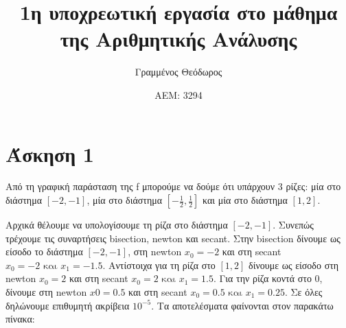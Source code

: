 \documentclass[12pt,a4paper]{article}
\author{Γραμμένος Θεόδωρος}
\title{1η υποχρεωτική εργασία στο μάθημα της Αριθμητικής Ανάλυσης}
\date{ΑΕΜ: 3294}
\begin{document}
    \maketitle
    \section{Άσκηση 1}
    \begin{center}     
    \end{center}    
    
    Από τη γραφική παράσταση της f μπορούμε να δούμε ότι υπάρχουν 3 ρίζες: μία στο διάστημα $[-2,-1]$, μία στο διάστημα $[-\frac{1}{2},\frac{1}{2}]$ και μία 
    στο διάστημα $[1,2]$.

    Αρχικά θέλουμε να υπολογίσουμε τη ρίζα στο διάστημα $[-2,-1]$. Συνεπώς τρέχουμε τις συναρτήσεις bisection, newton και secant. Στην bisection δίνουμε ως 
    είσοδο το διάστημα $[-2,-1]$, στη newton $x_0 = -2$ και στη secant $x_0=-2 \text{ και } x_1=-1.5$. Αντίστοιχα για τη ρίζα στο $[1,2]$ δίνουμε ως είσοδο 
    στη newton $x_0 = 2$ και στη secant $x_0 = 2 \text{ και } x_1=1.5$. Για την ρίζα κοντά στο 0, δίνουμε  στη newton $x0 = 0.5$ και στη secant $x_0 = 0.5 
    \text{ και } x_1=0.25$. Σε όλες δηλώνουμε επιθυμητή ακρίβεια $10^{-5}$. Τα αποτελέσματα φαίνονται στον παρακάτω πίνακα:
\end{document}
